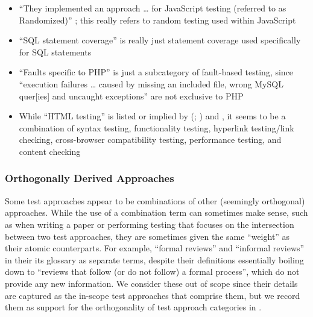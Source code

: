     \begin{itemize}
        \item ``They implemented an approach \dots{} for JavaScript testing
              (referred to as Randomized)'' \citep[p.~192]{DoğanEtAl2014};
              this really refers to random testing used within JavaScript
        \item ``SQL statement coverage'' is really just statement coverage
              used specifically for SQL statements \citep[Tab.~13]{DoğanEtAl2014}
        \item ``Faults specific to PHP'' is just a subcategory of fault-based
              testing, since ``execution failures \dots{} caused by missing an
              included file, wrong MySQL quer[ies] and uncaught exceptions''
              are not exclusive to PHP \citep[Tab.~27]{DoğanEtAl2014}
        \item While ``HTML testing'' is listed or implied by
              \citeauthor{Gerrard2000a} (\citeyear[Tab.~2]{Gerrard2000a};
              \citeyear[Tab.~1, p.~3]{Gerrard2000b}) and
              \citet[p.~220]{Patton2006}, it seems to be a combination of syntax
              testing, functionality testing, hyperlink testing/link checking,
              cross-browser compatibility testing, performance testing, and
              content checking \citep[p.~3]{Gerrard2000b}
    \end{itemize}

    \subsubsection{Orthogonally Derived Approaches}
    \label{orth-test}
    Some test approaches appear to be combinations of other (seemingly
    orthogonal) approaches. While the use of a combination term can sometimes
    make sense, such as when writing a paper or performing testing that focuses
    on the intersection between two test approaches, they are sometimes given
    the same ``weight'' as their atomic counterparts. For example, \citetISTQB{}
     ``formal reviews'' and ``informal reviews'' in
    \ifnotpaper their \else its \fi glossary as separate terms, despite their
    definitions essentially boiling down to ``reviews that follow (or do not
    follow) a formal process'', which do not provide any new information.
    We consider these out of scope since their details are captured as the
    in-scope test approaches that comprise them, but we record them as support
    for the orthogonality of test approach categories in .


